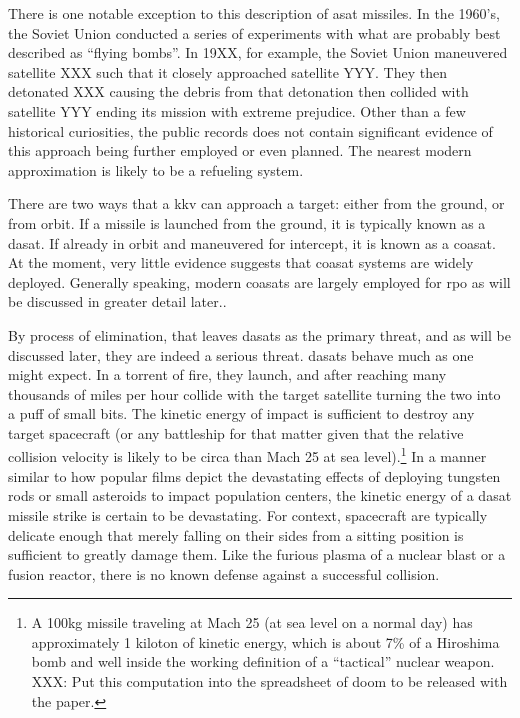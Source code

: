 There is one notable exception to this description of \ac{asat}
missiles.  In the 1960's, the Soviet Union conducted a series of
experiments with what are probably best described as ``flying
bombs''.\cite[xxx]{brian} In 19XX, for example, the Soviet Union
maneuvered satellite XXX such that it closely approached satellite
YYY.\cite[brian or grego]{xxx} They then detonated XXX causing the
debris from that detonation then collided with satellite YYY ending
its mission with extreme prejudice.\cite[xxx pick something]{xxx}
Other than a few historical curiosities, the public records does not
contain significant evidence of this approach being further employed
or even planned.  The nearest modern approximation is likely to be a
refueling system.

There are two ways that a \ac{kkv} can approach a target: either from
the ground, or from orbit.\cite[overview of asat missile paper
  needed]{xxx} If a missile is launched from the ground, it is
typically known as a \acf{dasat}.\cite[definition from brian?]{xxx} If
already in orbit and maneuvered for intercept, it is known as a
\acf{coasat}.\cite[definition from brian?]{xxx} At the moment, very
little evidence suggests that \ac{coasat} systems are widely deployed.
Generally speaking, modern \acp{coasat} are largely employed for
\ac{rpo} as will be discussed in greater detail
later.\cite[xxx]{brian}.

By process of elimination, that leaves \acp{dasat} as the primary
threat, and as will be discussed later, they are indeed a serious
threat.  \acp{dasat} behave much as one might expect.  In a torrent of
fire, they launch, and after reaching many thousands of miles per hour
collide with the target satellite turning the two into a puff of small
bits.\cite[kkv impact simulation]{xxx} The kinetic energy of impact is
sufficient to destroy any target spacecraft (or any battleship for
that matter given that the relative collision velocity is likely to be
circa than Mach 25 at sea level).\footnote{A 100kg missile traveling
at Mach 25 (at sea level on a normal day) has approximately 1 kiloton
of kinetic energy, which is about 7\% of a Hiroshima bomb and well
inside the working definition of a ``tactical'' nuclear weapon. XXX:
Put this computation into the spreadsheet of doom to be released with
the paper.} In a manner similar to how popular films depict the
devastating effects of deploying tungsten rods or small asteroids to
impact population centers, the kinetic energy of a \ac{dasat} missile
strike is certain to be devastating.  For context, spacecraft are
typically delicate enough that merely falling on their sides from a
sitting position is sufficient to greatly damage them.\cite{whoopsies}
Like the furious plasma of a nuclear blast or a fusion reactor, there
is no known defense against a successful collision.


